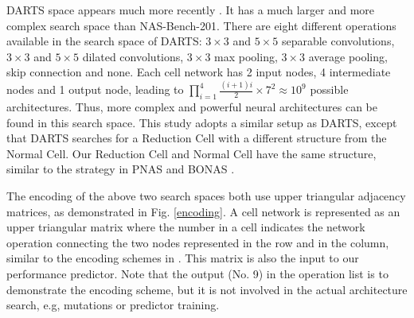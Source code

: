 \documentclass[sigconf]{acmart}
\begin{document}
DARTS space appears much more recently  \cite{Ref:52,Ref:33,Ref:31,Ref:53,Ref:07}. It has a much larger and more complex search space than NAS-Bench-201. There are eight different operations available in the search space of DARTS: $3\times3$ and $5\times5$ separable convolutions, $3\times3$ and $5\times5$ dilated convolutions, $3\times3$ max pooling, $3\times3$ average pooling, skip connection and none.  Each cell network has 2 input nodes, 4 intermediate nodes and 1 output node, leading to $\prod_{i=1}^{4} \frac{(i+1)i}{2} \times 7^2 \approx 10^9 $ possible architectures. Thus, more complex and powerful neural architectures can be found in this search space.  This study adopts a similar setup as DARTS, except that DARTS searches for a Reduction Cell with a different structure from the Normal Cell.  Our Reduction Cell and Normal Cell have the same structure, similar to the strategy in PNAS \cite{Ref:40} and BONAS \cite{Ref:31}.


The encoding of the above two search spaces both use upper triangular adjacency matrices, as demonstrated in Fig. \ref{encoding}.  A cell network is represented as an upper triangular matrix where the number in a cell indicates the network operation connecting the two nodes represented in the row and in the column, similar to the encoding schemes in \cite{Ref:45,Ref:31}.  This matrix is also the input to our performance predictor.  Note that the output (No. 9) in the operation list is to demonstrate the encoding scheme,  but it is not involved in the actual architecture search, e.g, mutations or predictor training.
\end{document}
